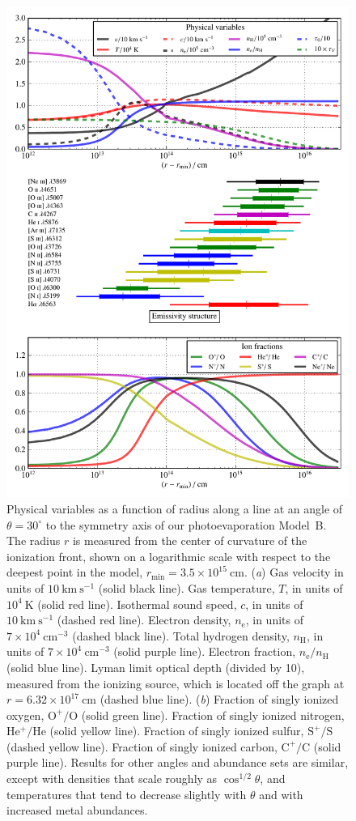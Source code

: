 \documentclass[useAMS,usenatbib]{mn2e}
\begin{document}
  \begin{figure}
    \includegraphics[width=0.75\linewidth]{model-structure-hst10-th30}
    \caption{Physical variables as a function of radius along a line at an angle of \(\theta = 30^{\circ}\) to the symmetry axis of our photoevaporation Model~B.    The radius \(r\) is measured from the center of curvature of the ionization front, shown on a logarithmic scale with respect to the deepest point in the model, \(r_{\mathrm{min}} = 3.5 \times 10^{15}\ \mathrm{cm}\).  (\textit{a}) Gas velocity in units of \(10\ \mathrm{km~s^{-1}}\) (solid black line).  Gas temperature, \(T\), in units of \(10^4\ \mathrm{K}\) (solid red line).  Isothermal sound speed, \(c\), in units of  \(10\ \mathrm{km~s^{-1}}\) (dashed red line).  Electron density, \(n_{\mathrm{e}}\), in units of \(7 \times 10^4\ \mathrm{cm^{-3}}\) (dashed black line).  Total hydrogen density, \(n_{\mathrm{H}}\), in units of  \(7 \times 10^4\ \mathrm{cm^{-3}}\) (solid purple line).  Electron fraction, \(n_{\mathrm{e}}/n_{\mathrm{H}}\) (solid blue line).  Lyman limit optical depth (divided by 10), measured from the ionizing source, which is located off the graph at \(r =  6.32 \times 10^{17}\ \mathrm{cm}\) (dashed blue line).  (\textit{b}) Fraction of singly ionized oxygen, \(\mathrm{O^{+}/O}\) (solid green line).  Fraction of singly ionized nitrogen, \(\mathrm{He^{+}/He}\) (solid yellow line).  Fraction of singly ionized sulfur, \(\mathrm{S^{+}/S}\) (dashed yellow line).  Fraction of singly ionized carbon, \(\mathrm{C^{+}/C}\) (solid purple line).  Results for other angles and abundance sets are similar, except with densities that scale roughly as \(\cos^{1/2}\theta\), and temperatures that tend to decrease slightly with \(\theta\) and with increased metal abundances.}
    \label{fig:model-structure}
  \end{figure}
\end{document}
